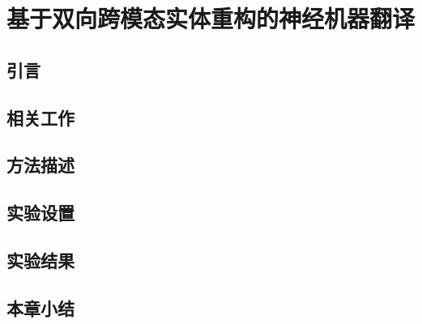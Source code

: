 \chapter{基于双向跨模态实体重构的神经机器翻译}

\section{引言}
\section{相关工作}

\section{方法描述}

\section{实验设置}

\section{实验结果}

\section{本章小结}
